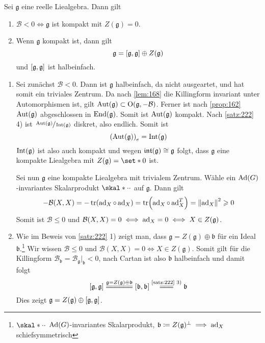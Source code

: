 \begin{lemma}[{name=[Eigenschaften kompakter Liealgebren]},label=lem:233]
	Sei $\mathfrak{g}$ eine reelle Liealgebra.
	Dann gilt 
	\begin{enumerate}[1)]
		\item $\mathcal{B} < 0 \iff \mathfrak{g}$ ist kompakt mit $Z(\mathfrak{g})=0$.
		\item Wenn $\mathfrak{g}$ kompakt ist, dann gilt 
		\[
			\mathfrak{g} = \benbrace*{\mathfrak{g},\mathfrak{g}} \oplus Z(\mathfrak{g})
		\]
		und $\benbrace*{\mathfrak{g},\mathfrak{g}}$ ist halbeinfach.
	\end{enumerate}
\end{lemma}
\begin{beweis}
	\begin{enumerate}[1)]
		\item Sei zunächst $\mathcal{B} < 0$.
		Dann ist $\mathfrak{g}$ halbeinfach, da nicht ausgeartet, und hat somit ein triviales Zentrum.
		Da nach \autoref{lem:168} die Killingform invariant unter Automorphismen ist, gilt $\Aut(\mathfrak{g}) \subset \On(\mathfrak{g},-\mathcal{B})$.
		Ferner ist nach \autoref{prop:162} $\Aut(\mathfrak{g})$ abgeschlossen in $\End(\mathfrak{g})$.
		Somit ist $\Aut(\mathfrak{g})$ kompakt.
		Nach \autoref{satz:222} 4) ist $\sfrac{\Aut(\mathfrak{g})}{\Int(\mathfrak{g})}$ diskret, also endlich.
		Somit ist
		\[
			\enbrace*{\Aut(\mathfrak{g})}_e = \Int(\mathfrak{g})
		\]
		$\Int(\mathfrak{g})$ ist also auch kompakt und wegen $\intAlg(\mathfrak{g}) \cong \mathfrak{g}$ folgt, dass $\mathfrak{g}$ eine kompakte Liealgebra mit $Z(\mathfrak{g})= \set*{0}$ ist.
		
		Sei nun $\mathfrak{g}$ eine kompakte Liealgebra mit trivialem Zentrum.
		Wähle ein $\Ad(G)$-invariantes Skalarprodukt $\skal*{\cdot}{\cdot}$ auf $\mathfrak{g}$.
		Dann gilt 
		\[
			- \mathcal{B}(X,X) = - \tr \enbrace*{\ad_X \circ \ad_X} = \tr \enbrace*{\ad_X \circ \ad_X^T} = \norm*{\ad_X}^2 \ge 0
		\]
		Somit ist $\mathcal{B} \le 0$ und $\mathcal{B}(X,X)=0 \iff \ad_X = 0 \iff X \in Z(\mathfrak{g})$.
		\item Wie im Beweis von \autoref{satz:222} 1) zeigt man, dass $\mathfrak{g} = Z(\mathfrak{g}) \oplus \mathfrak{b}$ für ein Ideal $\mathfrak{b}$.\footnote{$\skal*{\cdot}{\cdot}$ $\Ad(G)$-invariantes Skalarprodukt, $\mathfrak{b} \coloneqq Z(\mathfrak{g})^\perp \implies \ad_X$ schiefsymmetrisch}
		Wir wissen $\mathcal{B} \le 0$ und $\mathcal{B}(X,X) =0 \iff X \in Z(\mathfrak{g})$.
		Somit gilt für die Killingform $\mathcal{B}_\mathfrak{b} = \mathcal{B}_{\mathfrak{g}}|_{\mathfrak{b}} < 0$, nach Cartan ist also $\mathfrak{b}$ halbeinfach und damit folgt
		\[
			\benbrace*{\mathfrak{g},\mathfrak{g}} \stackrel{\mathfrak{g} = Z(\mathfrak{g}) \oplus \mathfrak{b}}{=\joinrel=\joinrel=\joinrel=\joinrel=\joinrel=}\benbrace*{\mathfrak{b},\mathfrak{b}} \StackText{\ref{satz:222} 3)}{=\joinrel=\joinrel=}\mathfrak{b}
		\]
		Dies zeigt $\mathfrak{g} = Z(\mathfrak{g}) \oplus \benbrace*{\mathfrak{g},\mathfrak{g}}$.\qedhere
	\end{enumerate}
\end{beweis}

